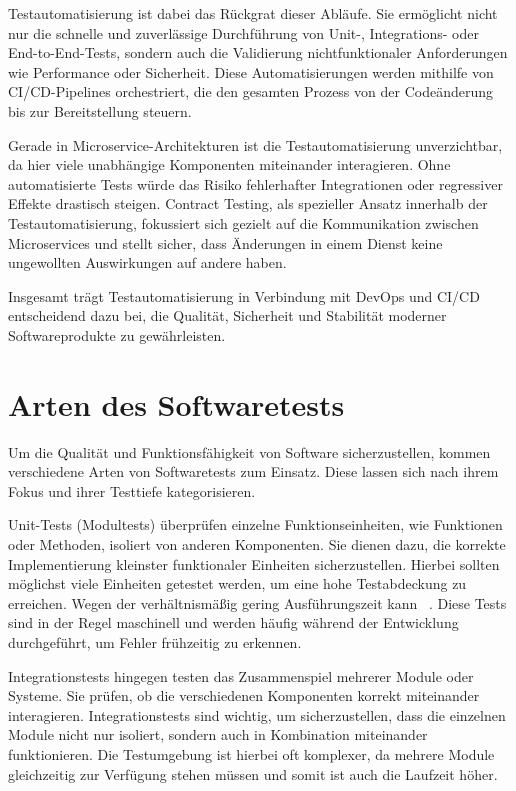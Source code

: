 Testautomatisierung ist dabei das Rückgrat dieser Abläufe.
Sie ermöglicht nicht nur die schnelle und zuverlässige Durchführung von Unit-, Integrations- oder End-to-End-Tests, sondern auch die Validierung nichtfunktionaler Anforderungen wie Performance oder Sicherheit.
Diese Automatisierungen werden mithilfe von \gls{CI}/\gls{CD}-Pipelines orchestriert, die den gesamten Prozess von der Codeänderung bis zur Bereitstellung steuern.

Gerade in Microservice-Architekturen ist die Testautomatisierung unverzichtbar, da hier viele unabhängige Komponenten miteinander interagieren.
Ohne automatisierte Tests würde das Risiko fehlerhafter Integrationen oder regressiver Effekte drastisch steigen.
Contract Testing, als spezieller Ansatz innerhalb der Testautomatisierung, fokussiert sich gezielt auf die Kommunikation zwischen Microservices und stellt sicher, dass Änderungen in einem Dienst keine ungewollten Auswirkungen auf andere haben.

Insgesamt trägt Testautomatisierung in Verbindung mit \gls{DevOps} und \gls{CI}/\gls{CD} entscheidend dazu bei, die Qualität, Sicherheit und Stabilität moderner Softwareprodukte zu gewährleisten.


\section{Arten des Softwaretests}\label{sec:foundation_testing}

Um die Qualität und Funktionsfähigkeit von Software sicherzustellen, kommen verschiedene Arten von Softwaretests zum Einsatz.
Diese lassen sich nach ihrem Fokus und ihrer Testtiefe kategorisieren.

Unit-Tests (Modultests) überprüfen einzelne Funktionseinheiten, wie Funktionen oder Methoden, isoliert von anderen Komponenten.
Sie dienen dazu, die korrekte Implementierung kleinster funktionaler Einheiten sicherzustellen.
Hierbei sollten möglichst viele Einheiten getestet werden, um eine hohe Testabdeckung zu erreichen.
Wegen der verhältnismäßig gering Ausführungszeit kann
~\cite{linzBasiswissenSoftwaretest2024}.
Diese Tests sind in der Regel maschinell und werden häufig während der Entwicklung durchgeführt, um Fehler
frühzeitig zu erkennen.

Integrationstests hingegen testen das Zusammenspiel mehrerer Module oder Systeme.
Sie prüfen, ob die verschiedenen Komponenten korrekt miteinander interagieren.
Integrationstests sind wichtig, um sicherzustellen, dass die einzelnen Module nicht nur isoliert, sondern auch in Kombination miteinander funktionieren.
Die Testumgebung ist hierbei oft komplexer, da mehrere Module gleichzeitig zur Verfügung stehen müssen und somit ist
auch die Laufzeit höher.

